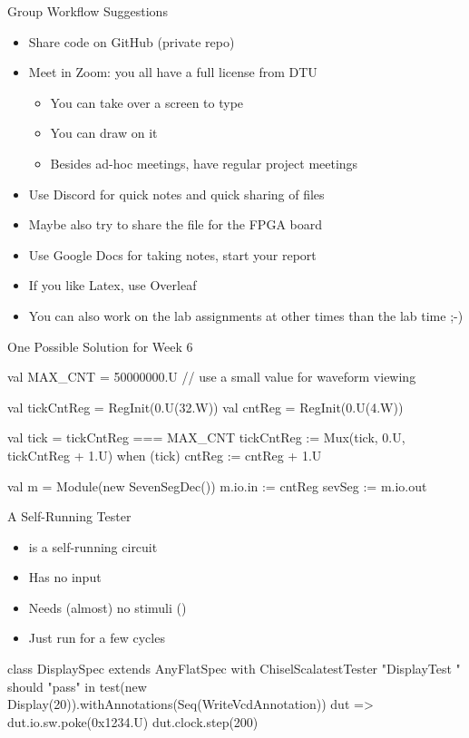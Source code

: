 \begin{frame}[fragile]{Group Workflow Suggestions}
\begin{itemize}
\item Share code on GitHub (private repo)
\item Meet in Zoom: you all have a full license from DTU
\begin{itemize}
\item You can take over a screen to type
\item You can draw on it
\item Besides ad-hoc meetings, have regular project meetings
\end{itemize}
\item Use Discord for quick notes and quick sharing of files
\item Maybe also try to share the  file for the FPGA board
\item Use Google Docs for taking notes, start your report
\item If you like Latex, use Overleaf
\item You can also work on the lab assignments at other times than the lab time ;-)
\end{itemize}
\end{frame}


\begin{frame}[fragile]{One Possible Solution for Week 6}
\begin{chisel}
  val MAX_CNT = 50000000.U // use a small value for waveform viewing

  val tickCntReg = RegInit(0.U(32.W))
  val cntReg = RegInit(0.U(4.W))

  val tick = tickCntReg === MAX_CNT
  tickCntReg := Mux(tick, 0.U, tickCntReg + 1.U)
  when (tick) {
    cntReg := cntReg + 1.U
  }

  val m = Module(new SevenSegDec())
  m.io.in := cntReg
  sevSeg := m.io.out
\end{chisel}
\end{frame}

\begin{frame}[fragile]{A Self-Running Tester}
\begin{itemize}
\item {} is a self-running circuit
\item Has no input
\item Needs (almost) no stimuli ()
\item Just run for a few cycles
\end{itemize}
\begin{chisel}
class DisplaySpec extends AnyFlatSpec with ChiselScalatestTester {
  "DisplayTest " should "pass" in {
    test(new Display(20)).withAnnotations(Seq(WriteVcdAnnotation)) { dut =>
      dut.io.sw.poke(0x1234.U)
      dut.clock.step(200)
    }
  }
}
\end{chisel}
\end{frame}


